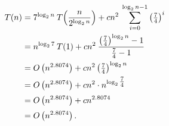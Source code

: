 \documentclass{scrartcl}
\begin{document}
\begin{align*}
	\vphantom{\rule{0pt}{2.5ex}} T(n) &= 7^{\log_{2}n} \: T\Big(\frac{n}{2^{\log_{2}n}}\Big) + cn^2 \: \sum_{i = 0}^{\log_{2}n-1} \left(\tfrac{7}{4}\right)^i \\
	\vphantom{\rule{0pt}{2.5ex}} &= n^{\log_{2}7} \: T(1) + cn^2 \:\frac{\left(\tfrac{7}{4}\right)^{\log_{2}n} - 1}{\tfrac{7}{4} - 1} \\
	\vphantom{\rule{0pt}{2.5ex}} &= O\left(n^{2.8074}\right) + cn^2 \left(\tfrac{7}{4}\right)^{\log_{2}n} \\
	\vphantom{\rule{0pt}{2.5ex}} &= O\left(n^{2.8074}\right) + cn^2 \cdot n^{\log_{2}\tfrac{7}{4}} \\
	\vphantom{\rule{0pt}{2.5ex}} &= O\left(n^{2.8074}\right) + cn^{2.8074} \\
	\vphantom{\rule{0pt}{2.5ex}} &= O\left(n^{2.8074}\right).
\end{align*}
\end{document}
